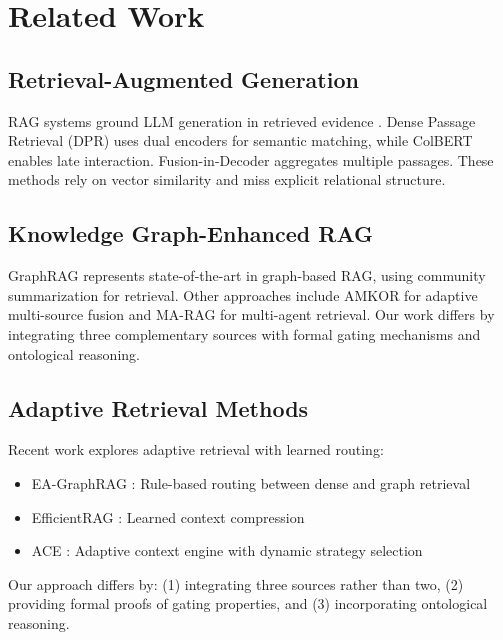 \documentclass[10pt,twocolumn]{article}
\begin{document}
\section{Related Work}

\subsection{Retrieval-Augmented Generation}

RAG systems ground LLM generation in retrieved evidence \cite{lewis2020rag}. Dense Passage Retrieval (DPR) \cite{karpukhin2020dpr} uses dual encoders for semantic matching, while ColBERT \cite{khattab2020colbert} enables late interaction. Fusion-in-Decoder \cite{izacard2021fid} aggregates multiple passages. These methods rely on vector similarity and miss explicit relational structure.

\subsection{Knowledge Graph-Enhanced RAG}

GraphRAG \cite{edge2024graphrag,microsoft2024graphrag} represents state-of-the-art in graph-based RAG, using community summarization for retrieval. Other approaches include AMKOR \cite{fang2024amkor} for adaptive multi-source fusion and MA-RAG \cite{li2024marag} for multi-agent retrieval. Our work differs by integrating three complementary sources with formal gating mechanisms and ontological reasoning.

\subsection{Adaptive Retrieval Methods}

Recent work explores adaptive retrieval with learned routing:
\begin{itemize}
    \item EA-GraphRAG \cite{li2024eagraphrag}: Rule-based routing between dense and graph retrieval
    \item EfficientRAG \cite{chen2024efficientrag}: Learned context compression
    \item ACE \cite{liu2024ace}: Adaptive context engine with dynamic strategy selection
\end{itemize}

Our approach differs by: (1) integrating three sources rather than two, (2) providing formal proofs of gating properties, and (3) incorporating ontological reasoning.
\end{document}
